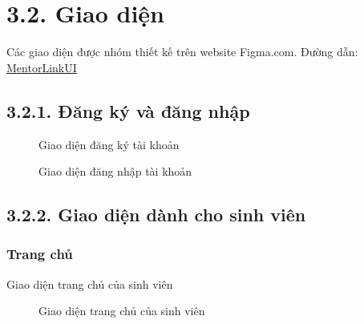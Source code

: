 \section*{3.2. Giao diện}
Các giao diện được nhóm thiết kế trên website Figma.com. Đường dẫn: \href{https://www.figma.com/design/JVJlph8kWxybLC45mcYPDN/BTL-CNPM?node-id=0-1&t=kgGeKYXHL2xgpn6x-1}{MentorLinkUI}
\subsection*{3.2.1. Đăng ký và đăng nhập}
\begin{figure}[H]
    \centering
    \setlength{\fboxsep}{2pt}      %
    \setlength{\fboxrule}{0.5pt}   %
    \caption{Giao diện đăng ký tài khoản}
\end{figure}
\begin{figure}[H]
    \centering
    \setlength{\fboxsep}{2pt}      
    \setlength{\fboxrule}{0.5pt}   
    \caption{Giao diện đăng nhập tài khoản}
\end{figure}

\newpage
\subsection*{3.2.2. Giao diện dành cho sinh viên}
\subsubsection*{Trang chủ}
Giao diện trang chủ của sinh viên
\begin{figure}[H]
    \centering
    \setlength{\fboxsep}{2pt}     
    \setlength{\fboxrule}{0.5pt}   
    \caption{Giao diện trang chủ của sinh viên}
\end{figure}

